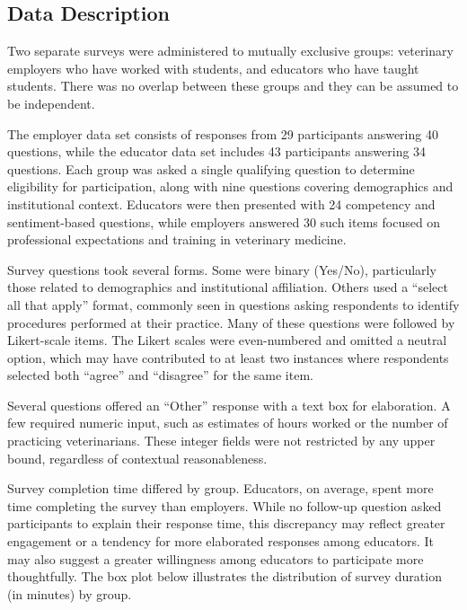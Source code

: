 \documentclass[
  11pt,
  letterpaper,
  DIV=11,
  numbers=noendperiod]{scrartcl}
\begin{document}
\hypertarget{data-description}{%
\subsection{Data Description}\label{data-description}}

Two separate surveys were administered to mutually exclusive groups:
veterinary employers who have worked with students, and educators who
have taught students. There was no overlap between these groups and they
can be assumed to be independent.

The employer data set consists of responses from 29 participants
answering 40 questions, while the educator data set includes 43
participants answering 34 questions. Each group was asked a single
qualifying question to determine eligibility for participation, along
with nine questions covering demographics and institutional context.
Educators were then presented with 24 competency and sentiment-based
questions, while employers answered 30 such items focused on
professional expectations and training in veterinary medicine.

Survey questions took several forms. Some were binary (Yes/No),
particularly those related to demographics and institutional
affiliation. Others used a ``select all that apply'' format, commonly
seen in questions asking respondents to identify procedures performed at
their practice. Many of these questions were followed by Likert-scale
items. The Likert scales were even-numbered and omitted a neutral
option, which may have contributed to at least two instances where
respondents selected both ``agree'' and ``disagree'' for the same item.

Several questions offered an ``Other'' response with a text box for
elaboration. A few required numeric input, such as estimates of hours
worked or the number of practicing veterinarians. These integer fields
were not restricted by any upper bound, regardless of contextual
reasonableness.

Survey completion time differed by group. Educators, on average, spent
more time completing the survey than employers. While no follow-up
question asked participants to explain their response time, this
discrepancy may reflect greater engagement or a tendency for more
elaborated responses among educators. It may also suggest a greater
willingness among educators to participate more thoughtfully. The box
plot below illustrates the distribution of survey duration (in minutes)
by group.
\end{document}
